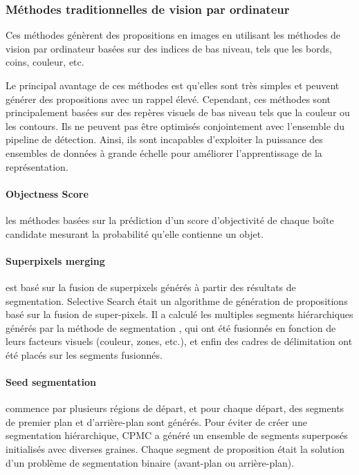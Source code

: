           \subsubsection{Méthodes traditionnelles de vision par ordinateur}
          Ces méthodes génèrent des propositions en images en utilisant les méthodes de vision par ordinateur basées sur des indices de bas niveau, tels que les bords, coins, couleur, etc. 

          Le principal avantage de ces méthodes est qu'elles sont très simples et peuvent générer des propositions avec un rappel élevé. Cependant, ces méthodes sont principalement basées sur des repères visuels de bas niveau tels que la couleur ou les contours. Ils ne peuvent pas être optimisés conjointement avec l'ensemble du pipeline de détection. Ainsi, ils sont incapables d'exploiter la puissance des ensembles de données à grande échelle pour améliorer l'apprentissage de la représentation.

          \paragraph{Objectness Score} les méthodes basées sur la prédiction d'un score d'objectivité de chaque boîte candidate mesurant la probabilité qu'elle contienne un objet.
          \paragraph{Superpixels merging} est basé sur la fusion de superpixels générés à partir des résultats de segmentation. Selective Search \cite{selctive_paper} était un algorithme de génération de propositions basé sur la fusion de super-pixels. Il a calculé les multiples segments hiérarchiques générés par la méthode de segmentation \cite{selctive_paper} , qui ont été fusionnés en fonction de leurs facteurs visuels (couleur, zones, etc.), et enfin des cadres de délimitation ont été placés sur les segments fusionnés.
          \paragraph{Seed segmentation} commence par plusieurs régions de départ, et pour chaque départ, des segments de premier plan et d'arrière-plan sont générés. Pour éviter de créer une segmentation hiérarchique, CPMC \cite{cpmc_paper} a généré un ensemble de segments superposés initialisés avec diverses graines. Chaque segment de proposition était la solution d'un problème de segmentation binaire (avant-plan ou arrière-plan).

